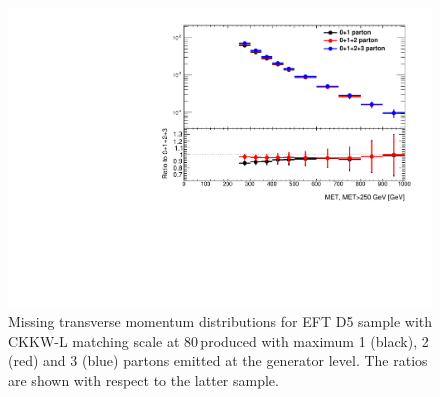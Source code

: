\begin{figure}[h!]
	\centering  
	\includegraphics[width=0.8\linewidth]{figures/monojet_appendix/h_MET_MET250.pdf}
	\caption{Missing transverse momentum distributions for EFT D5 sample with CKKW-L matching scale at 80\,\gev produced with maximum 1 (black), 2 (red) and 3 (blue) partons emitted at the generator level. The ratios are shown with respect to the latter sample.}
	\label{fig:RatioKine_D5}
\end{figure}



